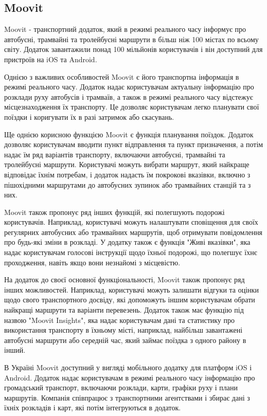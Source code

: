 \subsection{Moovit}
\label{subsec:moovit-subsection}

Moovit - транспортний додаток, який в режимі реального часу інформує 
про автобусні, трамвайні та тролейбусні маршрути в більш ніж 100 
містах по всьому світу. Додаток завантажили понад 100 мільйонів 
користувачів і він доступний для пристроїв на iOS та Android.

Однією з важливих особливостей Moovit є його транспортна інформація в 
режимі реального часу. Додаток надає користувачам актуальну інформацію 
про розклади руху автобусів і трамваїв, а також в режимі реального 
часу відстежує місцезнаходження їх транспорту. Це дозволяє 
користувачам легко планувати свої поїздки і коригувати їх в разі 
затримок або скасувань.

Ще однією корисною функцією Moovit є функція планування поїздок. 
Додаток дозволяє користувачам вводити пункт відправлення та пункт 
призначення, а потім надає їм ряд варіантів транспорту, включаючи 
автобусні, трамвайні та тролейбусні маршрути. Користувачі можуть 
вибрати маршрут, який найкраще відповідає їхнім потребам, і додаток 
надасть їм покрокові вказівки, включно з пішохідними маршрутами до 
автобусних зупинок або трамвайних станцій та з них.

Moovit також пропонує ряд інших функцій, які полегшують подорожі 
користувачів. Наприклад, користувачі можуть налаштувати сповіщення для 
своїх регулярних автобусних або трамвайних маршрутів, щоб отримувати 
повідомлення про будь-які зміни в розкладі. У додатку також є функція 
"Живі вказівки", яка надає користувачам голосові інструкції щодо 
їхньої подорожі, що полегшує їхнє проходження, навіть якщо вони 
незнайомі з місцевістю.

На додаток до своєї основної функціональності, Moovit також пропонує 
ряд інших можливостей. Наприклад, користувачі можуть залишати відгуки 
та оцінки щодо свого транспортного досвіду, які допоможуть іншим 
користувачам обрати найкращі маршрути та варіанти перевезень. Додаток 
також має функцію під назвою "Moovit Insights", яка надає користувачам 
дані та статистику про використання транспорту в їхньому місті, наприклад, найбільш завантажені автобусні маршрути або середній час, 
який займає поїздка з одного району в інший.

В Україні Moovit доступний у вигляді мобільного додатку для платформ 
iOS і Android. Додаток надає користувачам в режимі реального часу 
інформацію про громадський транспорт, включаючи розклади, карти, 
графіки руху і плани маршрутів.  Компанія співпрацює з транспортними 
агентствами і збирає дані з їхніх розкладів і карт, які потім 
інтегруються в додаток.

